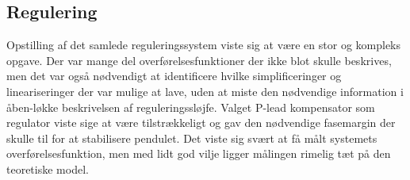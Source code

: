 \subsection{Regulering}
Opstilling af det samlede reguleringssystem viste sig at være en stor og kompleks opgave.
Der var mange del overførelsesfunktioner der ikke blot skulle beskrives, men det var også nødvendigt at identificere hvilke simplificeringer og lineariseringer der var mulige at lave, uden at miste den nødvendige information i åben-løkke beskrivelsen af reguleringssløjfe.
Valget P-lead kompensator som regulator viste sige at være tilstrækkeligt og gav den nødvendige fasemargin der skulle til for at stabilisere pendulet.
Det viste sig svært at få målt systemets overførelsesfunktion, men med lidt god vilje ligger målingen rimelig tæt på den teoretiske model. 



